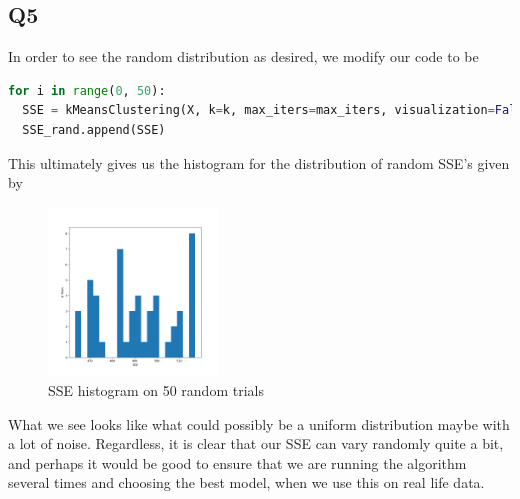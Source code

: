 \documentclass{article}
\theoremstyle{definition}
\begin{document}
    \subsection*{Q5}
        In order to see the random distribution as desired, we modify our 
        code to be
        \begin{lstlisting}[language=python]
for i in range(0, 50):
  SSE = kMeansClustering(X, k=k, max_iters=max_iters, visualization=False)[2]  
  SSE_rand.append(SSE)
        \end{lstlisting}
        This ultimately gives us the histogram for the distribution
        of random SSE's given by 
        \begin{figure}[htpb]
            \centering
            \includegraphics[width=0.4\textwidth]{figures/q5.png}
            \caption{SSE histogram on 50 random trials}
            \label{fig:}
        \end{figure}
        What we see looks like what could possibly be a uniform distribution
        maybe with a lot of noise. Regardless, it is clear that our SSE can 
        vary randomly quite a bit, and perhaps it would be good to ensure 
        that we are running the algorithm several times and choosing the 
        best model, when we use this on real life data.
\end{document}
